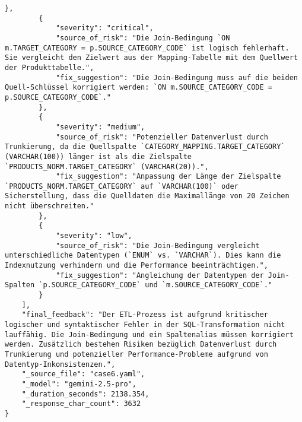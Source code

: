 \begin{lstlisting}[caption={Ausgabe: Gemini 2.5 Pro Anwendungsfall 6 Konsistenzdurchlauf},label={gemini_case6_prompt2}]
        },
        {
            "severity": "critical",
            "source_of_risk": "Die Join-Bedingung `ON m.TARGET_CATEGORY = p.SOURCE_CATEGORY_CODE` ist logisch fehlerhaft. Sie vergleicht den Zielwert aus der Mapping-Tabelle mit dem Quellwert der Produkttabelle.",
            "fix_suggestion": "Die Join-Bedingung muss auf die beiden Quell-Schlüssel korrigiert werden: `ON m.SOURCE_CATEGORY_CODE = p.SOURCE_CATEGORY_CODE`."
        },
        {
            "severity": "medium",
            "source_of_risk": "Potenzieller Datenverlust durch Trunkierung, da die Quellspalte `CATEGORY_MAPPING.TARGET_CATEGORY` (VARCHAR(100)) länger ist als die Zielspalte `PRODUCTS_NORM.TARGET_CATEGORY` (VARCHAR(20)).",
            "fix_suggestion": "Anpassung der Länge der Zielspalte `PRODUCTS_NORM.TARGET_CATEGORY` auf `VARCHAR(100)` oder Sicherstellung, dass die Quelldaten die Maximallänge von 20 Zeichen nicht überschreiten."
        },
        {
            "severity": "low",
            "source_of_risk": "Die Join-Bedingung vergleicht unterschiedliche Datentypen (`ENUM` vs. `VARCHAR`). Dies kann die Indexnutzung verhindern und die Performance beeinträchtigen.",
            "fix_suggestion": "Angleichung der Datentypen der Join-Spalten `p.SOURCE_CATEGORY_CODE` und `m.SOURCE_CATEGORY_CODE`."
        }
    ],
    "final_feedback": "Der ETL-Prozess ist aufgrund kritischer logischer und syntaktischer Fehler in der SQL-Transformation nicht lauffähig. Die Join-Bedingung und ein Spaltenalias müssen korrigiert werden. Zusätzlich bestehen Risiken bezüglich Datenverlust durch Trunkierung und potenzieller Performance-Probleme aufgrund von Datentyp-Inkonsistenzen.",
    "_source_file": "case6.yaml",
    "_model": "gemini-2.5-pro",
    "_duration_seconds": 2138.354,
    "_response_char_count": 3632
}
\end{lstlisting}

